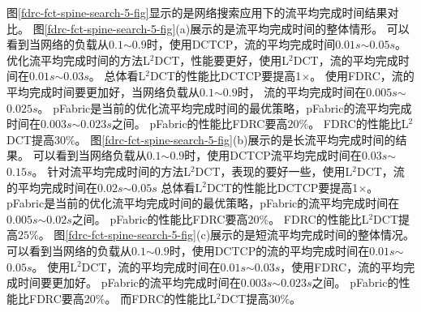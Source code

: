 图\ref{fdrc-fct-spine-search-5-fig}显示的是网络搜索应用下的流平均完成时间结果对比。
图\ref{fdrc-fct-spine-search-5-fig}(a)展示的是流平均完成时间的整体情形。
可以看到当网络的负载从$0.1$$\sim$$0.9$时，使用DCTCP，流的平均完成时间$0.01s$$\sim$$0.05s$。
优化流平均完成时间的方法L$^2$DCT，性能要更好，使用L$^2$DCT，流的平均完成时间在$0.01s$$\sim$$0.03s$。
总体看L$^2$DCT的性能比DCTCP要提高1$\times$。
使用FDRC，流的平均完成时间要更加好，当网络负载从$0.1$$\sim$$0.9$时，
流的平均完成时间在$0.005s$$\sim$$0.025s$。
pFabric是当前的优化流平均完成时间的最优策略，pFabric的流平均完成时间在$0.003s$$\sim$$0.023s$之间。
pFabric的性能比FDRC要高$20\%$。
FDRC的性能比L$^2$DCT提高$30\%$。
图\ref{fdrc-fct-spine-search-5-fig}(b)展示的是长流平均完成时间的结果。
可以看到当网络负载从$0.1$$\sim$$0.9$时，使用DCTCP流平均完成时间在$0.03s$$\sim$$0.15s$。
针对流平均完成时间的方法L$^2$DCT，表现的要好一些，使用L$^2$DCT，流的平均完成时间在$0.02s$$\sim$$0.05s$
总体看L$^2$DCT的性能比DCTCP要提高1$\times$。
pFabric是当前的优化流平均完成时间的最优策略，pFabric的流平均完成时间在$0.005s$$\sim$$0.02s$之间。
pFabric的性能比FDRC要高$20\%$。
FDRC的性能比L$^2$DCT提高$25\%$。
图\ref{fdrc-fct-spine-search-5-fig}(c)展示的是短流平均完成时间的整体情况。
可以看到当网络的负载从$0.1$$\sim$$0.9$时，使用DCTCP的流的平均完成时间在$0.01s$$\sim$$0.05s$。
使用L$^2$DCT，流的平均完成时间在$0.01s$$\sim$$0.03s$，使用FDRC，流的平均完成时间要更加好。
pFabric的流平均完成时间在$0.003s$$\sim$$0.023s$之间。
pFabric的性能比FDRC要高$20\%$。
而FDRC的性能比L$^2$DCT提高$30\%$。


